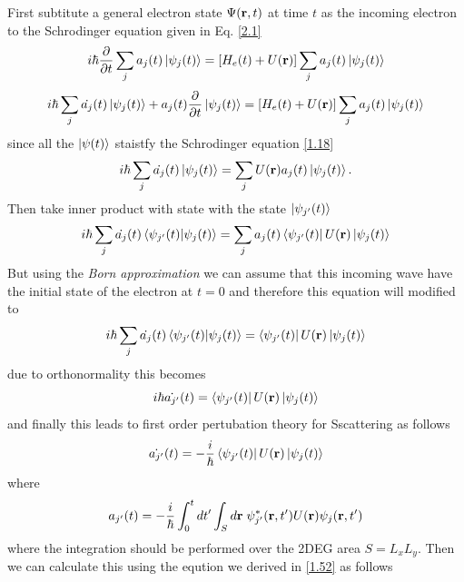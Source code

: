 \documentclass[a4paper]{article}
\numberwithin{equation}{subsection}
\numberwithin{equation}{section}
\begin{document}
\noindent
First subtitute a general electron state $\Psi(\vb{r},t)$ at time $t$ as the incoming electron to the Schrodinger equation given in Eq. \eqref{2.1}
\begin{equation} \label{2.5}
  i \hbar \pdv{t} \sum_j a_j(t) \ket{\psi_j(t)}= [H_e(t) + U(\vb{r})] \sum_j a_j(t) \ket{\psi_j(t)}
\end{equation}
\begin{equation} \label{2.6}
  i \hbar\sum_j   \dot{a_j}(t) \ket{\psi_j(t)} + a_j(t)\pdv{t}\ket{\psi_j(t)}= [H_e(t) + U(\vb{r})] \sum_j a_j(t) \ket{\psi_j(t)}
\end{equation}
since all the ${\ket{\psi(t)}}$ staistfy the Schrodinger equation \eqref{1.18}
\begin{equation} \label{2.7}
  i \hbar\sum_j   \dot{a_j}(t) \ket{\psi_j(t)} = \sum_j U(\vb{r}) a_j(t) \ket{\psi_j(t)}.
\end{equation}
Then take inner product with state with the state $\ket{\psi_{j'}(t)}$
\begin{equation} \label{2.8}
  i \hbar\sum_j   \dot{a_j}(t) \braket{\psi_{j'}(t)}{\psi_j(t)} = \sum_j
  a_j(t) \bra{\psi_{j'}(t)} U(\vb{r}) \ket{\psi_j(t)}
\end{equation}
But using the \textit{Born approximation} we can assume that this incoming wave have the initial state of the electron at $t=0$ and therefore this equation will modified to
\begin{equation} \label{2.9}
  i \hbar\sum_j   \dot{a_j}(t) \braket{\psi_{j'}(t)}{\psi_j(t)} =
  \bra{\psi_{j'}(t)} U(\vb{r}) \ket{\psi_j(t)}
\end{equation}
due to orthonormality this becomes
\begin{equation} \label{2.10}
  i \hbar \dot{a_{j'}}(t) =
  \bra{\psi_{j'}(t)} U(\vb{r}) \ket{\psi_j(t)}
\end{equation}
and finally this leads to first order pertubation theory for Sscattering as follows
\begin{equation} \label{2.11}
   \dot{a_{j'}}(t) =
  -\frac{i}{\hbar}\bra{\psi_{j'}(t)} U(\vb{r}) \ket{\psi_j(t)}
\end{equation}
where
\begin{equation} \label{2.12}
   a_{j'}(t) =
  -\frac{i}{\hbar}
  \int_0^t dt' \int_S d\vb{r} \;
  \psi_{j'}^{*} (\vb{r},t') U(\vb{r}) {\psi_j(\vb{r},t')}
\end{equation}
where the integration should be performed over the 2DEG area $S=L_xL_y$. Then we can calculate this using the eqution we derived in \eqref{1.52} as follows
\end{document}
